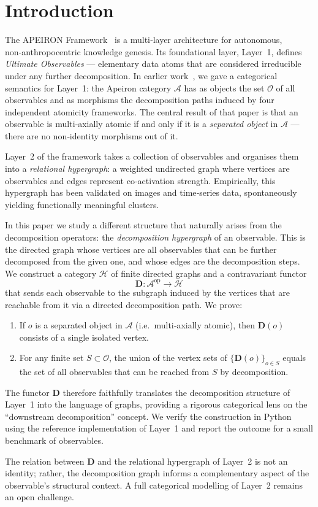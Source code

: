 \section{Introduction}\label{sec:intro}
The APEIRON Framework~\cite{Beniers2026Apeiron} is a multi‑layer architecture for autonomous, non‑anthropocentric knowledge genesis.
Its foundational layer, Layer~1, defines \emph{Ultimate Observables} — elementary data atoms that are considered irreducible under any further decomposition.
In earlier work~\cite{Beniers2026Categorical}, we gave a categorical semantics for Layer~1: the Apeiron category \(\mathcal{A}\) has as objects the set \(\mathcal{O}\) of all observables and as morphisms the decomposition paths induced by four independent atomicity frameworks.
The central result of that paper is that an observable is multi‑axially atomic if and only if it is a \emph{separated object} in \(\mathcal{A}\) — there are no non‑identity morphisms out of it.

Layer~2 of the framework takes a collection of observables and organises them into a \emph{relational hypergraph}: a weighted undirected graph where vertices are observables and edges represent co‑activation strength.
Empirically, this hypergraph has been validated on images and time‑series data, spontaneously yielding functionally meaningful clusters.

In this paper we study a different structure that naturally arises from the decomposition operators: the \emph{decomposition hypergraph} of an observable.
This is the directed graph whose vertices are all observables that can be further decomposed from the given one, and whose edges are the decomposition steps.
We construct a category \(\mathcal{H}\) of finite directed graphs and a contravariant functor
\[
\mathbf{D} : \mathcal{A}^{\mathrm{op}} \longrightarrow \mathcal{H}
\]
that sends each observable to the subgraph induced by the vertices that are reachable from it via a directed decomposition path.
We prove:
\begin{enumerate}
\item If \(o\) is a separated object in \(\mathcal{A}\) (i.e.\ multi‑axially atomic), then \(\mathbf{D}(o)\) consists of a single isolated vertex.
\item For any finite set \(S \subset \mathcal{O}\), the union of the vertex sets of \(\{\mathbf{D}(o)\}_{o \in S}\) equals the set of all observables that can be reached from \(S\) by decomposition.
\end{enumerate}
The functor \(\mathbf{D}\) therefore faithfully translates the decomposition structure of Layer~1 into the language of graphs, providing a rigorous categorical lens on the “downstream decomposition” concept.
We verify the construction in Python using the reference implementation of Layer~1 and report the outcome for a small benchmark of observables.

The relation between \(\mathbf{D}\) and the relational hypergraph of Layer~2 is not an identity; rather, the decomposition graph informs a complementary aspect of the observable’s structural context.
A full categorical modelling of Layer~2 remains an open challenge.